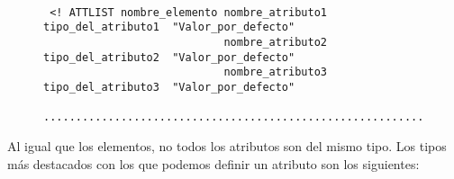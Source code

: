     \begin{figure}[H]
    \begin{tcolorbox}[sharp corners, colback=yellow!30, colframe=white!20]
        \scriptsize
        \begin{verbatim}

 <! ATTLIST nombre_elemento nombre_atributo1  tipo_del_atributo1  "Valor_por_defecto"
                            nombre_atributo2  tipo_del_atributo2  "Valor_por_defecto"
                            nombre_atributo3  tipo_del_atributo3  "Valor_por_defecto"
            ........................................................................>
        \end{verbatim}
    \end{tcolorbox}
\end{figure}

Al igual que los elementos, no todos los atributos son del mismo tipo. Los tipos más destacados con los que podemos definir un atributo son los siguientes:

